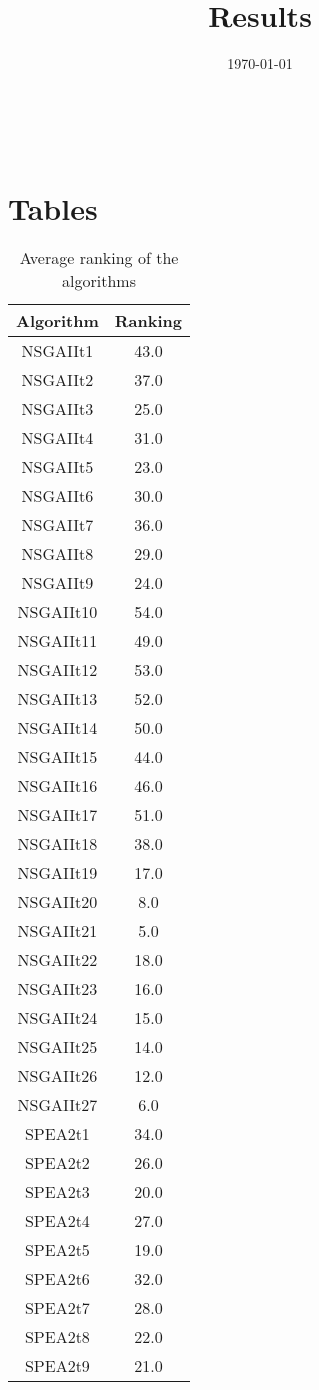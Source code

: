 \documentclass{article}
\title{Results}
\author{}
\date{\today}
\begin{document}
\oddsidemargin 0in \topmargin 0in\maketitle
\
\section{Tables}
\begin{table}[!htp]
\centering
\caption{Average ranking of the algorithms}
\begin{tabular}{c|c}
Algorithm&Ranking\\
\hline
NSGAIIt1&43.0\\
NSGAIIt2&37.0\\
NSGAIIt3&25.0\\
NSGAIIt4&31.0\\
NSGAIIt5&23.0\\
NSGAIIt6&30.0\\
NSGAIIt7&36.0\\
NSGAIIt8&29.0\\
NSGAIIt9&24.0\\
NSGAIIt10&54.0\\
NSGAIIt11&49.0\\
NSGAIIt12&53.0\\
NSGAIIt13&52.0\\
NSGAIIt14&50.0\\
NSGAIIt15&44.0\\
NSGAIIt16&46.0\\
NSGAIIt17&51.0\\
NSGAIIt18&38.0\\
NSGAIIt19&17.0\\
NSGAIIt20&8.0\\
NSGAIIt21&5.0\\
NSGAIIt22&18.0\\
NSGAIIt23&16.0\\
NSGAIIt24&15.0\\
NSGAIIt25&14.0\\
NSGAIIt26&12.0\\
NSGAIIt27&6.0\\
SPEA2t1&34.0\\
SPEA2t2&26.0\\
SPEA2t3&20.0\\
SPEA2t4&27.0\\
SPEA2t5&19.0\\
SPEA2t6&32.0\\
SPEA2t7&28.0\\
SPEA2t8&22.0\\
SPEA2t9&21.0\\

\end{tabular}
\end{table}
\end{document}
